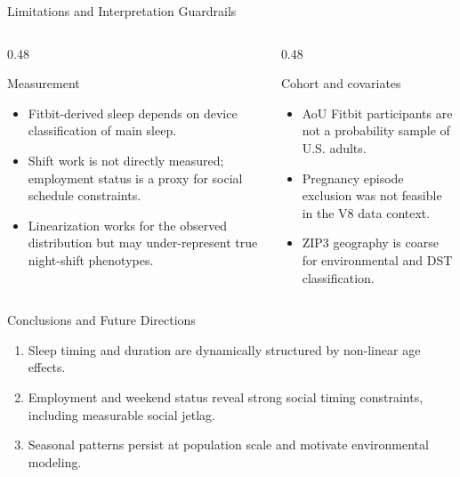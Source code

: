 \documentclass[aspectratio=169,10pt]{beamer}
\begin{document}
\begin{frame}{Limitations and Interpretation Guardrails}
  \begin{columns}[T,totalwidth=\textwidth]
    \begin{column}{0.48\textwidth}
      \begin{block}{Measurement}
        \begin{itemize}
          \item Fitbit-derived sleep depends on device classification of main sleep.
          \item Shift work is not directly measured; employment status is a proxy for social schedule constraints.
          \item Linearization works for the observed distribution but may under-represent true night-shift phenotypes.
        \end{itemize}
      \end{block}
    \end{column}
    \begin{column}{0.48\textwidth}
      \begin{block}{Cohort and covariates}
        \begin{itemize}
          \item AoU Fitbit participants are not a probability sample of U.S. adults.
          \item Pregnancy episode exclusion was not feasible in the V8 data context.
          \item ZIP3 geography is coarse for environmental and DST classification.
        \end{itemize}
      \end{block}
    \end{column}
  \end{columns}
\end{frame}

\begin{frame}{Conclusions and Future Directions}
  \begin{enumerate}
    \item Sleep timing and duration are dynamically structured by non-linear age effects.
    \item Employment and weekend status reveal strong social timing constraints, including measurable social jetlag.
    \item Seasonal patterns persist at population scale and motivate environmental modeling.
  \end{enumerate}
  \vspace{0.35cm}
\end{frame}
\end{document}
